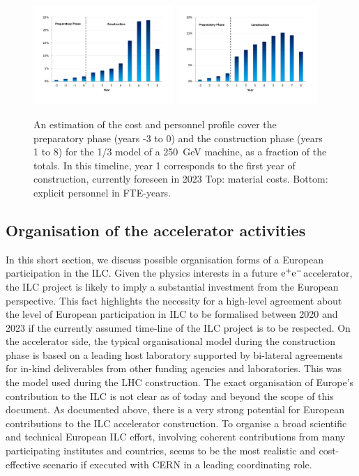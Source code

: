 \documentclass[%
 reprint,
 floatfix,
 amsmath,amssymb,
 aps,
]{revtex4-1}
\newcommand{\epem}{\mbox{${\rm e}^+{\rm e}^-$}}
\begin{document}
\begin{figure}[htbp]
\includegraphics[width=0.475\textwidth]{figures/ilc-eu-ikc-cost-profile-blue-250me.pdf}
\includegraphics[width=0.475\textwidth]{figures/ilc-eu-ikc-cost-profile-blue-fte.pdf}
\caption{\label{fig:costprofile:costprofile} An estimation of the cost and personnel profile cover the preparatory phase (years -3 to 0) 
and the construction phase (years 1 to 8) for the 1/3 model of a 250~GeV machine, as a fraction of the
totals. In this timeline, 
year 1 corresponds to the first year of construction, currently foreseen in 2023 
Top: material costs. Bottom: explicit personnel in FTE-years.
}
\end{figure}


\subsection{\label{sec:acc:org}Organisation of the accelerator activities}

In this short section, we discuss possible organisation forms of a European
participation in the ILC. 
Given the physics interests in a future \epem accelerator, the ILC project is likely to imply a substantial investment from
the European perspective. This fact highlights the necessity for a high-level
agreement about the level of European participation in ILC to be formalised between 2020
and 2023 if the currently assumed time-line of the ILC project is to be respected.
On the accelerator side, the typical organisational model during the construction phase is based on a leading host laboratory supported by 
bi-lateral agreements for in-kind deliverables from other funding agencies and laboratories. This was the model used during the LHC construction. 
The exact organisation of Europe's contribution to the ILC is not clear as of today and beyond the scope of this document. 
As documented above, there is a very strong potential for European contributions to the ILC accelerator construction.
To organise a broad scientific and technical European ILC effort, involving coherent contributions from many participating institutes and countries, 
seems to be the most realistic and cost-effective scenario if executed with CERN in a leading coordinating role.
\end{document}
